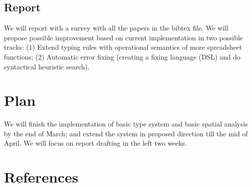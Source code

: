 \documentclass[a4paper]{article}
\begin{document}
\subsection{Report}
We will report with a survey with all the papers in the bibtex file. We will propose possible improvement based on current implementation in two possible tracks: (1) Extend typing rules with operational semantics of more spreadsheet functions; (2) Automatic error fixing (creating a fixing language (DSL) and do syntactical heuristic search).

\section{Plan}
We will finish the implementation of basic type system and basic spatial analysis by the end of March; and extend the system in proposed direction till the mid of April.
We will focus on report drafting in the left two weeks.

\section{References}

% 
% 
\end{document}
